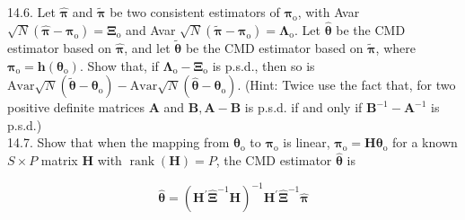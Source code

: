 \documentclass[10pt]{article}
\begin{document}
14.6. Let $\hat{\boldsymbol{\pi}}$ and $\tilde{\boldsymbol{\pi}}$ be two consistent estimators of $\boldsymbol{\pi}_{\mathrm{o}}$, with Avar $\sqrt{N}\left(\hat{\boldsymbol{\pi}}-\boldsymbol{\pi}_{\mathrm{o}}\right)=\boldsymbol{\Xi}_{\mathrm{o}}$ and Avar $\sqrt{N}\left(\tilde{\boldsymbol{\pi}}-\boldsymbol{\pi}_{\mathrm{o}}\right)=\boldsymbol{\Lambda}_{\mathrm{o}}$. Let $\hat{\boldsymbol{\theta}}$ be the CMD estimator based on $\hat{\boldsymbol{\pi}}$, and let $\tilde{\boldsymbol{\theta}}$ be the CMD estimator based on $\tilde{\boldsymbol{\pi}}$, where $\boldsymbol{\pi}_{\mathrm{o}}=\mathbf{h}\left(\boldsymbol{\theta}_{\mathrm{o}}\right)$. Show that, if $\boldsymbol{\Lambda}_{\mathrm{o}}-\boldsymbol{\Xi}_{\mathrm{o}}$ is p.s.d., then so is $\mathrm{Avar} \sqrt{N}\left(\tilde{\boldsymbol{\theta}}-\boldsymbol{\theta}_{\mathrm{o}}\right)-\mathrm{Avar} \sqrt{N}\left(\hat{\boldsymbol{\theta}}-\boldsymbol{\theta}_{\mathrm{o}}\right)$. (Hint: Twice use the fact that, for two positive definite matrices $\mathbf{A}$ and $\mathbf{B}, \mathbf{A}-\mathbf{B}$ is p.s.d. if and only if $\mathbf{B}^{-1}-\mathbf{A}^{-1}$ is p.s.d.)\\
14.7. Show that when the mapping from $\boldsymbol{\theta}_{\mathrm{o}}$ to $\boldsymbol{\pi}_{\mathrm{o}}$ is linear, $\boldsymbol{\pi}_{\mathrm{o}}=\mathbf{H} \boldsymbol{\theta}_{\mathrm{o}}$ for a known $S \times P$ matrix $\mathbf{H}$ with $\operatorname{rank}(\mathbf{H})=P$, the CMD estimator $\hat{\boldsymbol{\theta}}$ is


\begin{equation*}
\hat{\boldsymbol{\theta}}=\left(\mathbf{H}^{\prime} \hat{\boldsymbol{\Xi}}^{-1} \mathbf{H}\right)^{-1} \mathbf{H}^{\prime} \hat{\boldsymbol{\Xi}}^{-1} \hat{\boldsymbol{\pi}} \tag{14.89}
\end{equation*}
\end{document}
